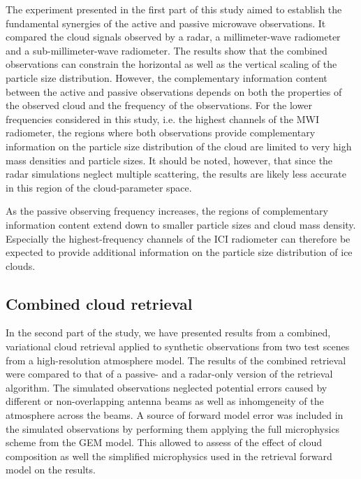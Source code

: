 \documentclass[journal abbreviation, manuscript]{copernicus}
\begin{document}
The experiment presented in the first part of this study aimed to establish the
fundamental synergies of the active and passive microwave observations. It
compared the cloud signals observed by a radar, a millimeter-wave radiometer and
a sub-millimeter-wave radiometer. The results show that the combined
observations can constrain the horizontal as well as the vertical scaling of the
particle size distribution. However, the complementary information content
between the active and passive observations depends on both the properties of
the observed cloud and the frequency of the observations. For the lower
frequencies considered in this study, i.e. the highest channels of the MWI
radiometer, the regions where both observations provide complementary
information on the particle size distribution of the cloud are limited to very
high mass densities and particle sizes. It should be noted, however, that since
the radar simulations neglect multiple scattering, the results are likely
less accurate in this region of the cloud-parameter space.

As the passive observing frequency increases, the regions of complementary
information content extend down to smaller particle sizes and cloud mass
density. Especially the highest-frequency channels of the ICI radiometer can
therefore be expected to provide additional information on the particle size
distribution of ice clouds.

\subsection{Combined cloud retrieval}

In the second part of the study, we have presented results from a combined,
variational cloud retrieval applied to synthetic observations from two test
scenes from a high-resolution atmosphere model. The results of the combined
retrieval were compared to that of a passive- and a radar-only version of the
retrieval algorithm. The simulated observations neglected potential errors
caused by different or non-overlapping antenna beams as well as inhomgeneity of
the atmosphere across the beams. A source of forward model error was included in
the simulated observations by performing them applying the full microphysics
scheme from the GEM model. This allowed to assess of the effect of cloud
composition as well the simplified microphysics used in the retrieval forward
model on the results.
\end{document}

